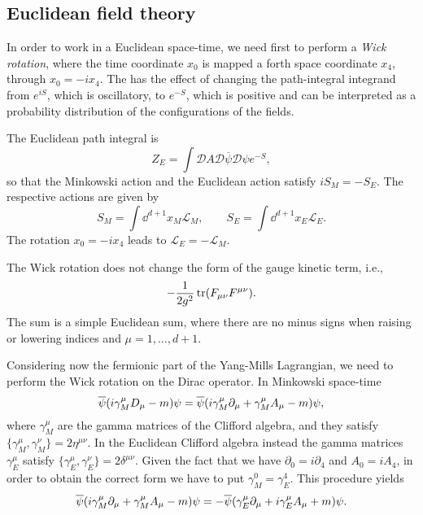 \subsection{Euclidean field theory}
\label{sub:euclidean_field_theory}

In order to work in a Euclidean space-time, we need first to perform a \emph{Wick rotation}, where the time coordinate $x_0$ is mapped a forth space coordinate $x_4$, through $x_0 = - i x_4$.
The has the effect of changing the path-integral integrand from $e^{i S}$, which is oscillatory, to $e^{-S}$, which is positive and can be interpreted as a probability distribution of the configurations of the fields.

The Euclidean path integral is
\begin{equation}
    Z_E = \int \mathcal{D} A \mathcal{D} \overline{\psi} \mathcal{D} \psi e^{-S},
\end{equation}
so that the Minkowski action and the Euclidean action satisfy $i S_M = - S_E$.
The respective actions are given by
\begin{equation}
    S_M = \int \dd^{d+1} x_M \mathcal{L}_M, \qquad
    S_E = \int \dd^{d+1} x_E \mathcal{L}_E.
\end{equation}
The rotation $x_0 = -i x_4$ leads to $\mathcal{L}_E = - \mathcal{L}_M$.

The Wick rotation does not change the form of the gauge kinetic term, i.e.,
\begin{equation}
    - \frac{1}{2 g^2} \tr(F_{\mu \nu} F^{\mu \nu}).
\end{equation}
The sum is a simple Euclidean sum, where there are no minus signs when raising or lowering indices and $\mu = 1, \dots, d+1$.

Considering now the fermionic part of the Yang-Mills Lagrangian, we need to perform the Wick rotation on the Dirac operator.
In Minkowski space-time
\begin{equation}
    \overline{\psi} \qty( i \gamma^{\mu}_M D_{\mu} - m ) \psi
    = \overline{\psi} \qty( i \gamma^{\mu}_M \partial_{\mu} + \gamma^{\mu}_M A_{\mu} - m ) \psi,
\end{equation}
where $\gamma^{\mu}_M$ are the gamma matrices of the Clifford algebra, and they satisfy $\{\gamma^{\mu}_M, \gamma^{\nu}_M\} = 2 \eta^{\mu \nu}$.
In the Euclidean Clifford algebra instead the gamma matrices $\gamma^{\mu}_E$ satisfy $\{\gamma^{\mu}_E, \gamma^{\nu}_E\} = 2 \delta^{\mu \nu}$.
Given the fact that we have $\partial_0 = i \partial_4$ and $A_0 = i A_4$, in order to obtain the correct form we have to put $\gamma^0_M = \gamma^4_E$.
This procedure yields
\begin{equation}
    \overline{\psi} \qty( i \gamma^{\mu}_M \partial_{\mu} + \gamma^{\mu}_M A_{\mu} - m ) \psi
    =
    - \overline{\psi} \qty( \gamma^{\mu}_E \partial_{\mu} + i\gamma^{\mu}_E A_{\mu} + m ) \psi.
\end{equation}


